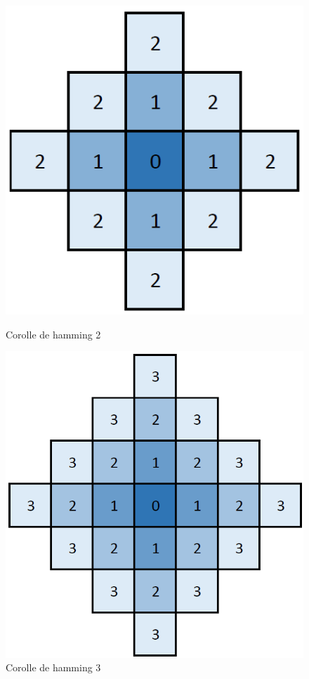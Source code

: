 \begin{figure}[H]
\begin{minipage}[t]{0.33\textwidth}
			\includegraphics[width=\linewidth]{images/corolle_hamming_2.png}
			\caption{Corolle de hamming 2}\label{fig:corolle_hamming_2}
		\end{minipage}\hfill
		\begin{minipage}[t]{0.33\textwidth}
			\includegraphics[width=\linewidth]{images/corolle_hamming_3.png}
			\caption{Corolle de hamming 3}\label{fig:corolle_hamming_3}
		\end{minipage}\hfill
	\end{figure}

